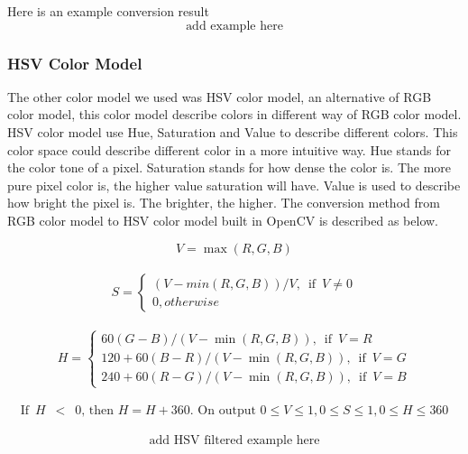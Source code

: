             Here is an example conversion result
            $$ \textrm{add example here} $$
        \subsubsection{HSV Color Model}
            The other color model we used was HSV color model, an alternative of RGB color model, this color model describe colors in different way of RGB color model.
            HSV color model use Hue, Saturation and Value to describe different colors.
            This color space could describe different color in a more intuitive way.
            Hue stands for the color tone of a pixel. %
            Saturation stands for how dense the color is. The more pure pixel color is, the higher value saturation will have.
            Value is used to describe how bright the pixel is. The brighter, the higher.
            The conversion method from RGB color model to HSV color model built in OpenCV is described as below.

            $$
                V = \max(R,G,B)
            $$\\
            $$
                S = 
                \begin{cases}
                    {{{(V-min(R,G,B))}/{V}}, \enspace\textrm{if}\enspace V \neq 0}\\
                    {0, otherwise}
                \end{cases}
            $$\\
            $$
                H =
                \begin{cases} 
                    {{60(G - B)}/{(V-\min(R,G,B))}, \enspace\textrm{if}\enspace V=R}\\
                    {{120+60(B - R)}/{(V-\min(R,G,B))}, \enspace\textrm{if}\enspace V=G}\\
                    {{240+60(R - G)}/{(V-\min(R,G,B))}, \enspace\textrm{if}\enspace V=B}
                \end{cases}
            $$\\
            $$
                \textrm{If} \enspace H \enspace < \enspace 0 \textrm{, then } H = H + 360. \textrm{ On output } 0 \leq V \leq 1, 0 \leq S \leq 1, 0 \leq H \leq 360
            $$\\
            $$ \textrm{add HSV filtered example here} $$

